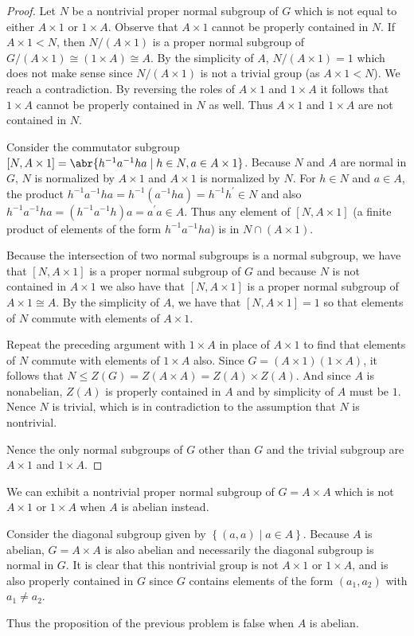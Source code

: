 \documentclass[11pt]{article}
\newcommand{\cbr}[1]{\left\{#1\right\}}
\begin{document}
\begin{enumerate}
\begin{proof}
      Let $N$ be a nontrivial proper normal subgroup of $G$ which is not equal to either $A\times 1$ or $1\times A$. Observe that $A\times 1$ cannot be properly contained in $N$. If $A\times 1 < N$, then $N/(A\times 1)$ is a proper normal subgroup of $G/(A\times 1) \cong (1\times A)\cong A$. By the simplicity of $A$, $N/(A\times 1) = 1$ which does not make sense since $N/(A\times 1)$ is not a trivial group (as $A\times 1 < N$). We reach a contradiction. By reversing the roles of $A\times 1$ and $1\times A$ it follows that $1\times A$ cannot be properly contained in $N$ as well. Thus $A\times 1$ and $1\times A$ are not contained in $N$. 
      
      Consider the commutator subgroup $[N, A\times 1] = \abr{h^{-1}a^{-1}ha\mid h\in N, a\in A\times 1}$. Because $N$ and $A$ are normal in $G$, $N$ is normalized by $A\times 1$ and $A\times 1$ is normalized by $N$. For $h\in N$ and $a\in A$, the product $h^{-1}a^{-1}ha = h^{-1}(a^{-1}ha) = h^{-1}h^{\prime}\in N$ and also $h^{-1}a^{-1}ha = (h^{-1}a^{-1}h)a = a^{\prime}a \in A$. Thus any element of $[N,A\times 1]$ (a finite product of elements of the form $h^{-1}a^{-1}ha$) is in $N\cap (A\times 1)$. 

      Because the intersection of two normal subgroups is a normal subgroup, we have that $[N, A\times 1]$ is a proper normal subgroup of $G$ and because $N$ is not contained in $A\times 1$ we also have that $[N, A\times 1]$ is a proper normal subgroup of $A\times 1 \cong A$. By the simplicity of $A$, we have that $[N, A\times 1] = 1$ so that elements of $N$ commute with elements of $A\times 1$. 
      
      Repeat the preceding argument with $1\times A$ in place of $A\times 1$ to find that elements of $N$ commute with elements of $1\times A$ also. Since $G = (A\times 1)(1\times A)$, it follows that $N\leq Z(G) = Z(A\times A) = Z(A)\times Z(A)$. And since $A$ is nonabelian, $Z(A)$ is properly contained in $A$ and by simplicity of $A$ must be $1$. Nence $N$ is trivial, which is in contradiction to the assumption that $N$ is nontrivial.

      Nence the only normal subgroups of $G$ other than $G$ and the trivial subgroup are $A\times 1$ and $1\times A$.
    \end{proof}

    We can exhibit a nontrivial proper normal subgroup of $G = A\times A$ which is not $A\times 1$ or $1\times A$ when $A$ is abelian instead.

    Consider the diagonal subgroup given by $\cbr{(a,a)\mid a\in A}$. Because $A$ is abelian, $G = A\times A$ is also abelian and necessarily the diagonal subgroup is normal in $G$. It is clear that this nontrivial group is not $A\times 1$ or $1\times A$, and is also properly contained in $G$ since $G$ contains elements of the form $(a_1, a_2)$ with $a_1\neq a_2$.

    Thus the proposition of the previous problem is false when $A$ is abelian.
\end{enumerate}
\end{document}
